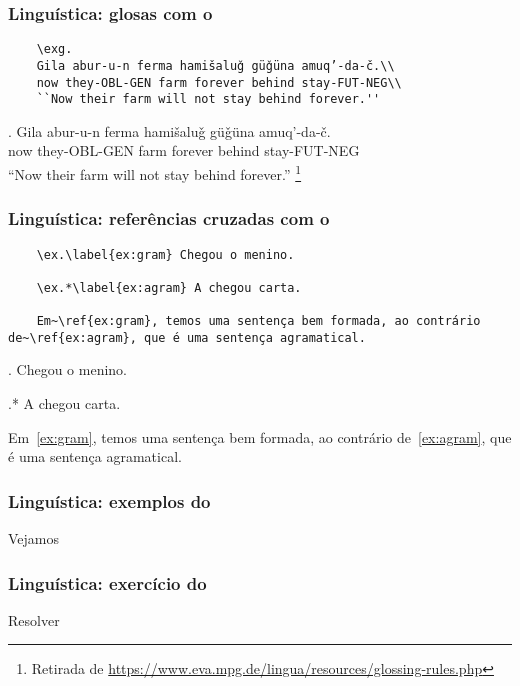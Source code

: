 \begin{frame}[fragile]
  \frametitle{Linguística: glosas com o }
  \small

  \begin{verbatim}
    \exg.
    Gila abur-u-n ferma hamišaluǧ güǧüna amuq’-da-č.\\
    now they-OBL-GEN farm forever behind stay-FUT-NEG\\
    ``Now their farm will not stay behind forever.''
  \end{verbatim}

  \exg.
  Gila abur-u-n ferma hamišaluǧ güǧüna amuq’-da-č.\\
  now they-OBL-GEN farm forever behind stay-FUT-NEG\\
  ``Now their farm will not stay behind forever.''%
  \footnote{Retirada de
  \url{https://www.eva.mpg.de/lingua/resources/glossing-rules.php}}

\end{frame}

\begin{frame}[fragile]
  \frametitle{Linguística: referências cruzadas com o }
  \normalsize

  \begin{verbatim}
    \ex.\label{ex:gram} Chegou o menino.

    \ex.*\label{ex:agram} A chegou carta.

    Em~\ref{ex:gram}, temos uma sentença bem formada, ao contrário de~\ref{ex:agram}, que é uma sentença agramatical.
  \end{verbatim}

  \vfill

  \ex.\label{ex:gram} Chegou o menino.

  \ex.*\label{ex:agram} A chegou carta.

  Em~\ref{ex:gram}, temos uma sentença bem formada, ao contrário
  de~\ref{ex:agram}, que é uma sentença agramatical.

\end{frame}

\begin{frame}
  \frametitle{Linguística: exemplos do }
  \huge
  Vejamos 
\end{frame}

\begin{frame}
  \frametitle{Linguística: exercício do }
  \huge
  Resolver 
\end{frame}
